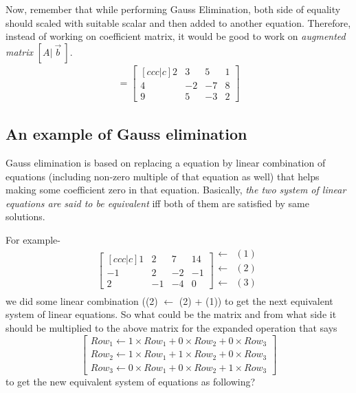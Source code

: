 \documentclass{article}
\begin{document}
Now, remember that while performing Gauss Elimination, both side of equality should scaled with suitable scalar and then added to another equation. Therefore, instead of working on coefficient matrix, it would be good to work on \textit{augmented matrix} $[A|~\vec{b}~]$.\\

\begin{align}
        [A |~\vec{b}~] = \begin{bmatrix}[ccc|c]
                2 & 3 & 5 & 1\\
                4 & -2 & -7 & 8\\
                9 & 5 & -3 & 2
            \end{bmatrix} \nonumber
\end{align}
\subsection{An example of Gauss elimination}
Gauss elimination is based on replacing a equation by linear combination of equations (including non-zero multiple of that equation as well) that helps making some coefficient zero in that equation. Basically, \textit{the two system of linear equations are said to be equivalent} iff both of them are satisfied by same solutions.

For example-
\[
\begin{bmatrix}[ccc|c]
    1 & 2 & 7 & 14 \\
    -1 & 2 & -2 & -1 \\
    2 & -1 & -4 & 0
\end{bmatrix} \begin{matrix}
                  \longleftarrow & (1) \\  
                  \longleftarrow & (2) \\  
                  \longleftarrow & (3) \\  
              \end{matrix}
\]
we did some linear combination ((2) $\longleftarrow$ (2) + (1)) to get the next equivalent system of linear equations. So what could be the matrix and from what side it should be multiplied to the above matrix for the expanded operation that says
\[
\begin{bmatrix}
    Row_1\leftarrow 1\times Row_1+0\times Row_2+0\times Row_3\\
    Row_2\leftarrow 1\times Row_1+1\times Row_2+0\times Row_3\\
    Row_3\leftarrow 0\times Row_1+0\times Row_2+1\times Row_3
\end{bmatrix}
\]
to get the new equivalent system of equations as following?
\end{document}
